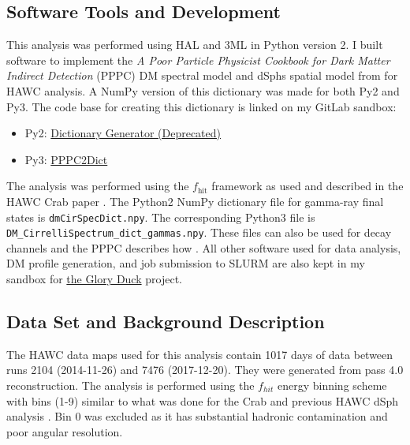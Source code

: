 \subsection{Software Tools and Development}\label{sec:gd_tools}

This analysis was performed using HAL and 3ML \cite{Abeysekara_2017, vianello2015multimission} in Python version 2.
I built software to implement the \emph{A Poor Particle Physicist Cookbook for Dark Matter Indirect Detection} (PPPC) \cite{Cirelli_2011} DM spectral model and dSphs spatial model from \cite{Geringer_Sameth_2015} for HAWC analysis.
A NumPy version of this dictionary was made for both Py2 and Py3.
The code base for creating this dictionary is linked on my GitLab sandbox:

\begin{itemize}
    \item Py2: \href{https://gitlab.com/hawc-observatory/sandboxes/salaza82/glory-duck-hawc/-/tree/master/GD_spectrum}{Dictionary Generator (Deprecated)}
    \item Py3: \href{https://gitlab.com/hawc-observatory/sandboxes/salaza82/pppc2dict}{PPPC2Dict}
\end{itemize}

The analysis was performed using the $f_{\textrm{hit}}$ framework as used and described in the HAWC Crab paper \cite{Abeysekara_2017}.
The Python2 NumPy dictionary file for gamma-ray final states is \texttt{dmCirSpecDict.npy}.
The corresponding Python3 file is \texttt{DM\_CirrelliSpectrum\_dict\_gammas.npy}.
These files can also be used for decay channels and the PPPC describes how \cite{Cirelli_2011}.
All other software used for data analysis, DM profile generation, and job submission to SLURM are also kept in my sandbox for \href{https://gitlab.com/hawc-observatory/sandboxes/salaza82/glory-duck-hawc}{the Glory Duck} project.

\subsection{Data Set and Background Description} \label{sec:gs_data_bkgd}

The HAWC data maps used for this analysis contain 1017 days of data between runs 2104 (2014-11-26) and 7476 (2017-12-20).
They were generated from pass 4.0 reconstruction.
The analysis is performed using the $f_{hit}$ energy binning scheme with bins (1-9) similar to what was done for the Crab and previous HAWC dSph analysis \cite{Abeysekara_2017,Albert_2018}.
Bin 0 was excluded as it has substantial hadronic contamination and poor angular resolution.


